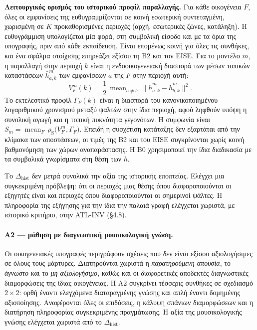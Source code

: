 \documentclass[11pt,a4paper]{article}
\newcommand{\dhist}{\Delta_{\mathrm{hist}}}
\begin{document}
\noindent\textbf{Λειτουργικός ορισμός του ιστορικού προφίλ παραλλαγής.} Για κάθε οικογένεια $F$, όλες οι εμφανίσεις της ευθυγραμμίζονται σε κοινή εσωτερική συντεταγμένη, χωρισμένη σε $K$ προκαθορισμένες περιοχές (αρχή, εσωτερικές ζώνες, κατάληξη). Η ευθυγράμμιση υπολογίζεται μία φορά, στη συμβολική είσοδο και με τα όρια της υπογραφής, πριν από κάθε εκπαίδευση. Είναι επομένως κοινή για όλες τις συνθήκες, και ένα σφάλμα στοίχισης επηρεάζει εξίσου τη B2 και τον EISE. Για το μοντέλο $m$, η παραλλαγή στην περιοχή $k$ είναι η ενδοοικογενειακή διασπορά των μέσων τοπικών καταστάσεων $\bar h^{m}_{a,k}$ των εμφανίσεων $a$ της $F$ στην περιοχή αυτή:
\[
V^{m}_{F}(k)=\frac{1}{2}\,\operatorname{mean}_{a\neq b}\,\bigl\lVert \bar h^{m}_{a,k}-\bar h^{m}_{b,k}\bigr\rVert^{2}.
\]
Το εκτελεστικό προφίλ $\Gamma_F(k)$ είναι η διασπορά του κανονικοποιημένου λογαριθμικού χρονισμού μεταξύ ψαλτών στην ίδια περιοχή, αφού ληφθούν υπόψη η συνολική αγωγή και η τοπική πυκνότητα γεγονότων. Η συμφωνία είναι $S_m=\operatorname{mean}_F\,\rho_{\mathrm{S}}\bigl(V^{m}_{F},\Gamma_F\bigr)$. Επειδή η συσχέτιση κατάταξης δεν εξαρτάται από την κλίμακα των αποστάσεων, οι τιμές της B2 και του EISE συγκρίνονται χωρίς κοινή βαθμονόμηση των χώρων αναπαράστασης. Η B0 χρησιμοποιεί την ίδια διαδικασία με τα συμβολικά γνωρίσματα στη θέση των $h$.

Το $\dhist$ δεν μετρά συνολικά την αξία της ιστορικής εποπτείας. Ελέγχει μια συγκεκριμένη πρόβλεψη: ότι οι περιοχές μιας θέσης όπου διαφοροποιούνται οι εξηγητές είναι και περιοχές όπου διαφοροποιούνται οι σημερινοί ψάλτες. Η πληροφορία της εξήγησης για την ίδια την παλαιά γραφή ελέγχεται χωριστά, με ιστορικό κριτήριο, στην ATL-INV (§4.8).

\paragraph{Α2 — μάθηση με διαγνωστική μουσικολογική γνώση.}
Οι οικογενειακές υπογραφές περιγράφουν σχέσεις που δεν είναι εξίσου αξιολογήσιμες σε όλους τους μάρτυρες. Διατηρούνται χωριστά η \emph{παρατηρούμενη απουσία}, το \emph{άγνωστο} και το \emph{μη αξιολογήσιμο}, καθώς και οι διαφορετικές αποδεκτές διαγνωστικές διαμορφώσεις της ίδιας οικογένειας. Η Α2 συγκρίνει τέσσερις συνθήκες σε σχεδιασμό $2\times2$: ορθή έναντι ελεγχόμενα διαταραγμένης γνώσης και απλή έναντι δομημένης αξιοποίησης. Αναφέρονται όλες οι επιδόσεις, η κάλυψη σπάνιων διαμορφώσεων και η διατήρηση πληροφορίας συγκεκριμένης πραγμάτωσης. Η αξία της μουσικολογικής γνώσης ελέγχεται χωριστά από το $\Delta_{\mathrm{hist}}$.
\end{document}
